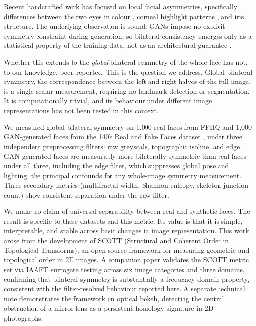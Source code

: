 \documentclass[11pt,a4paper]{article}
\begin{document}
Recent handcrafted work has focused on local facial asymmetries, specifically
differences between the two eyes in colour \citep{matern2019exploiting},
corneal highlight patterns \citep{hu2021exposing}, and iris structure. The
underlying observation is sound: GANs impose no explicit symmetry constraint
during generation, so bilateral consistency emerges only as a statistical
property of the training data, not as an architectural guarantee
\citep{gragnaniello2022detection}.

Whether this extends to the \emph{global} bilateral symmetry of the whole face
has not, to our knowledge, been reported. This is the question we address.
Global bilateral symmetry, the correspondence between the left and right halves
of the full image, is a single scalar measurement, requiring no landmark
detection or segmentation. It is computationally trivial, and its behaviour
under different image representations has not been tested in this context.

We measured global bilateral symmetry on 1,000 real faces from FFHQ
\citep{karras2019style} and 1,000 GAN-generated faces from the 140k Real and
Fake Faces dataset \citep{tunguz2020, xhlulu2020}, under three independent
preprocessing filters: raw greyscale, topographic isoline, and edge.
GAN-generated faces are measurably more bilaterally symmetric than real faces
under all three, including the edge filter, which suppresses global pose and
lighting, the principal confounds for any whole-image symmetry measurement.
Three secondary metrics (multifractal width, Shannon entropy, skeleton junction
count) show consistent separation under the raw filter.

We make no claim of universal separability between real and synthetic faces.
The result is specific to these datasets and this metric. Its value is that it
is simple, interpretable, and stable across basic changes in image
representation. This work arose from the development of SCOTT (Structural and
Coherent Order in Topological Transforms), an open-source framework for
measuring geometric and topological order in 2D images. A companion paper
\citep{cundill2026spatial} validates the SCOTT metric set via IAAFT surrogate
testing across six image categories and three domains, confirming that bilateral
symmetry is substantially a frequency-domain property, consistent with the
filter-resolved behaviour reported here. A separate technical note
\citep{cundill2026bokeh} demonstrates the framework on optical bokeh,
detecting the central obstruction of a mirror lens as a persistent homology
signature in 2D photographs.
\end{document}
